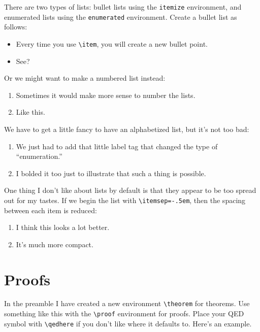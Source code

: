 \documentclass[12pt]{article}
\begin{document}
There are two types of lists: bullet lists using the \verb|itemize| environment,
and enumerated lists using the \verb|enumerated| environment. Create a bullet
list as follows:
\begin{itemize}	
	\item Every time you use \verb|\item|, you will create a new bullet point.
	
	\item See?
\end{itemize}
Or we might want to make a numbered list instead:
\begin{enumerate}
	\item Sometimes it would make more sense to number the lists.
	
	\item Like this. 
\end{enumerate}
We have to get a little fancy to have an alphabetized list, but it's not too
bad:
\begin{enumerate}[label=\textbf{(\alph*)}]
\item We just had to add that little label tag that changed the type of
``enumeration.''
	
	\item I bolded it too just to illustrate that such a thing is possible.
\end{enumerate}
One thing I don't like about lists by default is that they appear to be too
spread out for my tastes. If we begin the list with \verb|\itemsep=-.5em|, then
the spacing between each item is reduced:
\begin{enumerate}[label=\textbf{(\Alph*)}]
	\itemsep-.5em
	\item I think this looks a lot better.	
	\item It's much more compact. 
\end{enumerate}
	
	

\section{Proofs}

In the preamble I have created a new environment \verb|\theorem| for theorems.
Use something like this with the \verb|\proof| environment for proofs. Place
your QED symbol with \verb|\qedhere| if you don't like where it defaults to. Here's an example.
\end{document}
